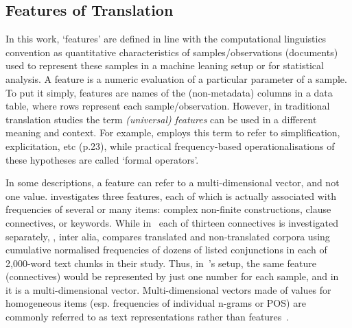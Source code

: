 \subsection{\label{ssec:feats}Features of Translation}
In this work, `features' are defined in line with the computational linguistics convention as quantitative characteristics of samples/observations (documents) used to represent these samples in a machine leaning setup or for statistical analysis. A feature is a numeric evaluation of a particular parameter of a sample. To put it simply, features are names of the (non-metadata) columns in a data table, where rows represent each sample/observation.
However, in traditional translation studies the term \textit{(universal) features} can be used in a different meaning and context. For example, \citet{Zanettin2013} employs this term to refer to simplification, explicitation, etc (p.23), while practical frequency-based operationalisations of these hypotheses are called `formal operators'. 


In some descriptions, a feature can refer to a multi-dimensional vector, and not one value. \citet{Puurtinen2003} investigates three features, each of which is actually associated with frequencies of several or many items: complex non-finite constructions, clause connectives, or keywords. While in~\citet{Puurtinen2003} each of thirteen connectives is investigated separately, \citet{Xiao2010}, inter alia, compares translated and non-translated corpora using cumulative normalised frequencies of dozens of listed conjunctions in each of 2,000-word text chunks in their study. Thus, in~\citeauthor{Xiao2010}'s \citeyear{Xiao2010} setup, the same feature (connectives) would be represented by just one number for each sample, and in~\citet{Puurtinen2003} it is a multi-dimensional vector.
Multi-dimensional vectors made of values for homogeneous items (esp. frequencies of individual n-grams or POS) are commonly referred to as text representations rather than features~\cite[see usage in ][]{Baroni2005,Kurokawa2009}. 

